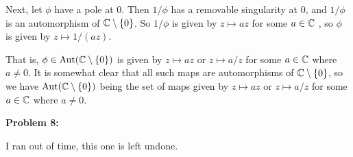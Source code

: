 \documentclass[a4paper,12pt]{article}
\begin{document}
Next, let $\phi$ have a pole at $0$. Then $1/\phi$ has a removable singularity at $0$, and $1/\phi$ is an automorphism of $\mathbb{C} \setminus \{0\}$. So $1/\phi$ is given by $z \mapsto az$ for some $a \in \mathbb{C}$ , so $\phi$ is given by $z \mapsto 1/(az)$.

That is, $\phi \in \text{Aut}(\mathbb{C} \setminus \{0\})$ is given by $z \mapsto az$ or $z \mapsto a/z$ for some $a \in \mathbb{C}$ where $a \neq 0$. It is somewhat clear that all such maps are automorphisms of $\mathbb{C} \setminus \{0\}$, so we have $\text{Aut}(\mathbb{C} \setminus \{0\})$ being the set of maps given by $z \mapsto az$ or $z \mapsto a/z$ for some $a \in \mathbb{C}$ where $a \neq 0$. %

\shunt

{\bf Problem 8:}

I ran out of time, this one is left undone.

\shunt
\end{document}
